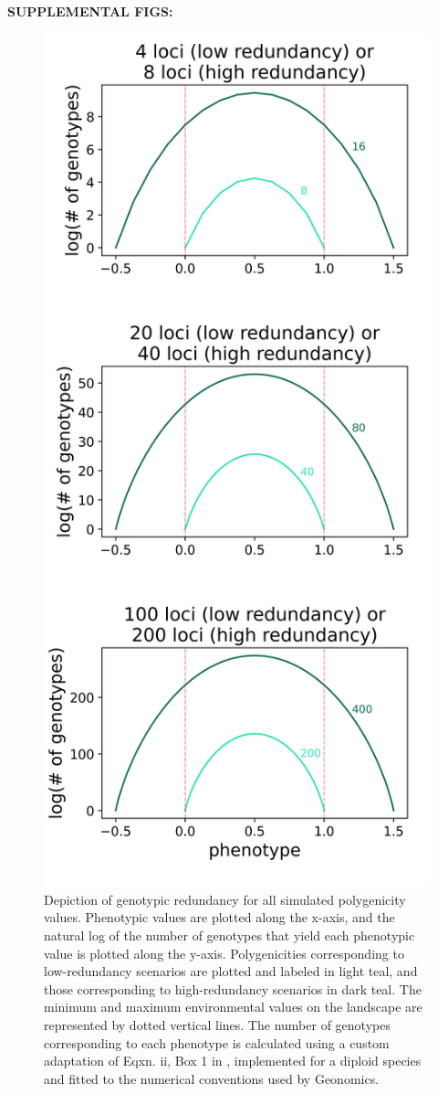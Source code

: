 \documentclass[9pt,twocolumn,twoside,lineno]{pnas-new}
\begin{document}
\pagebreak
\textbf{SUPPLEMENTAL FIGS:}


\begin{figure}
\centering
\includegraphics[width=.8\linewidth]{pub/figs/FIG_S1_redundancy.png}
\caption{Depiction of genotypic redundancy for all simulated polygenicity values. Phenotypic values are plotted along the x-axis, and the natural log of the number of genotypes that yield each phenotypic value is plotted along the y-axis. Polygenicities corresponding to low-redundancy scenarios are plotted and labeled in light teal, and those corresponding to high-redundancy scenarios in dark teal. The minimum and maximum environmental values on the landscape are represented by dotted vertical lines. The number of genotypes corresponding to each phenotype is calculated using a custom adaptation of Eqxn. ii, Box 1 in \cite{laruson}, implemented for a diploid species and fitted to the numerical conventions used by Geonomics.
}
\label{fig:fig_s1}
\end{figure}
\end{document}
